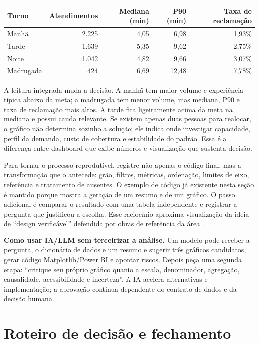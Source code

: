\begin{center}
\small
\begin{tabular}{lrrrr}
\toprule
Turno & Atendimentos & Mediana (min) & P90 (min) & Taxa de reclamação \\
\midrule
Manhã & 2.225 & 4,05 & 6,98 & 1,93\% \\
Tarde & 1.639 & 5,35 & 9,62 & 2,75\% \\
Noite & 1.042 & 4,82 & 9,66 & 3,07\% \\
Madrugada & 424 & 6,69 & 12,48 & 7,78\% \\
\bottomrule
\end{tabular}
\end{center}

A leitura integrada muda a decisão. A manhã tem maior volume e experiência típica abaixo da meta; a madrugada tem menor volume, mas mediana, P90 e taxa de reclamação mais altos. A tarde fica ligeiramente acima da meta na mediana e possui cauda relevante. Se existem apenas duas pessoas para realocar, o gráfico não determina sozinho a solução; ele indica onde investigar capacidade, perfil da demanda, custo de cobertura e estabilidade do padrão. Essa é a diferença entre dashboard que exibe números e visualização que sustenta decisão.

Para tornar o processo reprodutível, registre não apenas o código final, mas a transformação que o antecede: grão, filtros, métricas, ordenação, limites de eixo, referência e tratamento de ausentes. O exemplo de código já existente nesta seção é mantido porque mostra a geração de um resumo e de um gráfico. O passo adicional é comparar o resultado com uma tabela independente e registrar a pergunta que justificou a escolha. Esse raciocínio aproxima visualização da ideia de ``design verificável'' defendida por obras de referência da área \cite{munzner2014,wilke2019,knaflic2015}.

\begin{GuidedBox}
\textbf{Como usar IA/LLM sem terceirizar a análise.} Um modelo pode receber a pergunta, o dicionário de dados e um resumo e sugerir três gráficos candidatos, gerar código Matplotlib/Power BI e apontar riscos. Depois peça uma segunda etapa: ``critique seu próprio gráfico quanto a escala, denominador, agregação, causalidade, acessibilidade e incerteza''. A IA acelera alternativas e implementação; a aprovação continua dependente do contrato de dados e da decisão humana.
\end{GuidedBox}


\section{Roteiro de decisão e fechamento}


